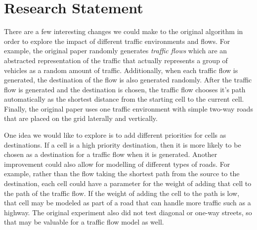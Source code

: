 \documentclass[sigplan,screen]{acmart}
\begin{document}

\maketitle

\section{Research Statement}
There are a few interesting changes we could make to the original algorithm in
order to explore the impact of different traffic environments and flows. For
example, the original paper randomly generates \textit{traffic flows} which are
an abstracted representation of the traffic that actually represents a group of
vehicles as a random amount of traffic. Additionally, when each traffic flow is
generated, the destination of the flow is also generated randomly. After the
traffic flow is generated and the destination is chosen, the traffic flow
chooses it's path automatically as the shortest distance from the starting cell
to the current cell. Finally, the original paper uses one traffic environment
with simple two-way roads that are placed on the grid laterally and vertically.

One idea we would like to explore is to add different priorities for cells as
destinations. If a cell is a high priority destination, then it is more likely
to be chosen as a destination for a traffic flow when it is generated. Another
improvement could also allow for modelling of different types of roads. For
example, rather than the flow taking the shortest path from the source to the
destination, each cell could have a parameter for the weight of adding that cell
to the path of the traffic flow. If the weight of adding the cell to the path is
low, that cell may be modeled as part of a road that can handle more traffic
such as a highway. The original experiment also did not test diagonal or one-way
streets, so that may be valuable for a traffic flow model as well.
\end{document}
